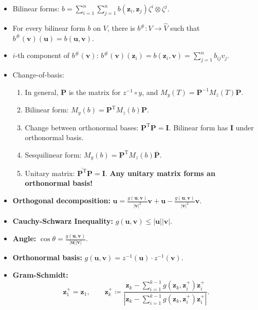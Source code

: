 \documentclass[10pt]{article}
\newcommand{\abs}[1]{\left\lvert#1\right\rvert}
\begin{document}
\begin{multicols*}{3}
\begin{itemize}
\begin{enumerate}
            \end{enumerate}
            \item Bilinear forms: $b = \sum_{i = 1}^{n}\sum_{j = 1}^{n}b\left(\bm{z}_i, \bm{z}_j\right)\zeta^i\otimes\zeta^j$.
            \item For every bilinear form $b$ on $V$, there is $b^{\#} \colon V \to \widehat{V}$ such that $b^{\#}(\bm{v})(\bm{u}) = b(\bm{u}, \bm{v})$.
            \item $i$-th component of $b^{\#}(\bm{v})$: $b^{\#}(\bm{v})(\bm{z}_i) = b(\bm{z}_i, \bm{v}) = \sum_{j = 1}^{n}b_{ij}v_j$.
            \item Change-of-basis:
            \begin{enumerate}
                \item In general, $\bm{P}$ is the matrix for $z^{-1} \circ y$, and $M_y(T) = \bm{P}^{-1}M_z(T)\bm{P}$.
                \item Bilinear form: $M_y(b) = \bm{P}^{\mathrm{T}}M_z(b)\bm{P}$.
                \item Change between orthonormal bases: $\bm{P}^{\mathrm{T}}\bm{P} = \bm{I}$. Bilinear form has $\bm{I}$ under orthonormal basis.
                \item Sesquilinear form: $M_y(b) = \bm{P}^{\mathrm{T}}M_z(b)\overline{\bm{P}}$.
                \item Unitary matrix: $\overline{\bm{P}^{\mathrm{T}}}\bm{P} = \bm{I}$. \textbf{Any unitary matrix forms an orthonormal basis!}
            \end{enumerate}
            \item \textbf{Orthogonal decomposition:} $\bm{u} = \frac{g(\bm{u}, \bm{v})}{\abs{\bm{v}}^2}\bm{v} + \bm{u} - \frac{g(\bm{u}, \bm{v})}{\abs{\bm{v}}^2}\bm{v}$.
            \item \textbf{Cauchy-Schwarz Inequality:} $g(\bm{u}, \bm{v}) \leq \abs{\bm{u}}\abs{\bm{v}}$.
            \item \textbf{Angle:} $\cos\theta = \frac{g(\bm{u}, \bm{v})}{\abs{\bm{u}}\abs{\bm{v}}}$.
            \item \textbf{Orthonormal basis:} $g(\bm{u}, \bm{v}) = z^{-1}(\bm{u}) \cdot z^{-1}(\bm{v})$.
            \item \textbf{Gram-Schmidt:}
            \begin{equation*}
                \bm{z}_1^+ = \bm{z}_1, \qquad \bm{z}_k^+ \coloneqq \frac{\bm{z}_k - \sum_{i = 1}^{k - 1}g\left(\bm{z}_k, \bm{z}_i^+\right)\bm{z}_i^+}{\abs{\bm{z}_k - \sum_{i = 1}^{k - 1}g\left(\bm{z}_k, \bm{z}_i^+\right)\bm{z}_i^+}}.

\end{equation*}
\end{itemize}
\end{multicols*}
\end{document}
